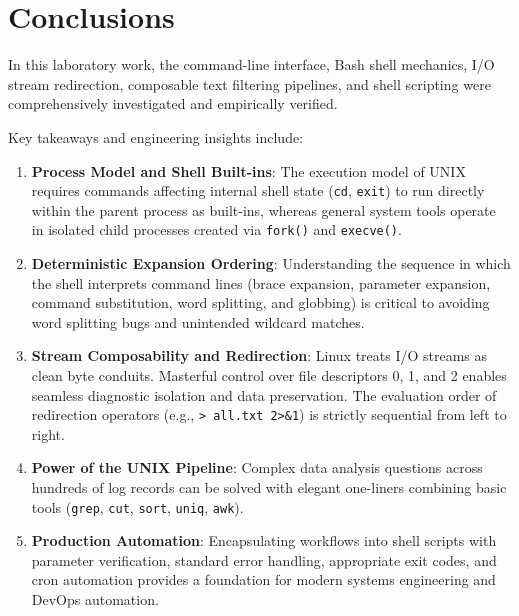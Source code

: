 \documentclass[12pt,a4paper]{article}
\begin{document}
\section{Conclusions}
In this laboratory work, the command-line interface, Bash shell mechanics, I/O stream redirection, composable text filtering pipelines, and shell scripting were comprehensively investigated and empirically verified.

Key takeaways and engineering insights include:
\begin{enumerate}
    \item \textbf{Process Model and Shell Built-ins}: The execution model of UNIX requires commands affecting internal shell state (\texttt{cd}, \texttt{exit}) to run directly within the parent process as built-ins, whereas general system tools operate in isolated child processes created via \texttt{fork()} and \texttt{execve()}.
    \item \textbf{Deterministic Expansion Ordering}: Understanding the sequence in which the shell interprets command lines (brace expansion, parameter expansion, command substitution, word splitting, and globbing) is critical to avoiding word splitting bugs and unintended wildcard matches.
    \item \textbf{Stream Composability and Redirection}: Linux treats I/O streams as clean byte conduits. Masterful control over file descriptors 0, 1, and 2 enables seamless diagnostic isolation and data preservation. The evaluation order of redirection operators (e.g., \texttt{> all.txt 2>\&1}) is strictly sequential from left to right.
    \item \textbf{Power of the UNIX Pipeline}: Complex data analysis questions across hundreds of log records can be solved with elegant one-liners combining basic tools (\texttt{grep}, \texttt{cut}, \texttt{sort}, \texttt{uniq}, \texttt{awk}).
    \item \textbf{Production Automation}: Encapsulating workflows into shell scripts with parameter verification, standard error handling, appropriate exit codes, and cron automation provides a foundation for modern systems engineering and DevOps automation.
\end{enumerate}
\end{document}
